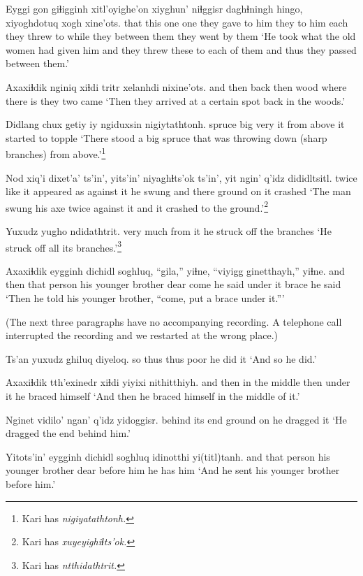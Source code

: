 \documentclass[12pt]{article}
\begin{document}
\gll Eyggi gon giɬigginh xitl'oyighe'on  xiyghun' niɬggisr daghɬningh hingo, xiyoghdotuq  {xogh xine'ots.}
that {this one} one {they gave to him} {they to him} each {they threw to} while {they between them} {they went by them}
\glt `He took what the old women had given him and they threw these to each of them and thus they passed between them.'	
\glend

\gll Axaxiɬdik nginiq xiɬdi tritr xelanhdi nixine'ots.
{and then} back then wood {where there is} {they two came}
\glt `Then they arrived at a certain spot back in the woods.'
\glend

\gll Didlang chux getiy iy ngiduxsin nigiytathtonh.
spruce  big very it {from above} {it started to topple}
\glt `There stood a big spruce that was throwing down (sharp branches) from above.'\footnote{Kari has \em nigiyatathtonh.}
\glend

\gll Nod xiq'i dixet'a' ts'in', yits'in'  niyaghɬts'ok ts'in', yit ngin'  q'idz dididltsitl.
twice like {it appeared} as {against it} {he swung} and there ground on {it crashed}
\glt `The man swung his axe twice against it and it crashed to the ground.'\footnote{Kari has \em xuyeyighiɬts'ok.}
\glend

\gll Yuxudz yugho ndidathtrit.
{very much} {from it} {he struck off the branches}
\glt `He struck off all its branches.'\footnote{Kari has \em ntthidathtrit.}
\glend

\gll Axaxiɬdik eygginh dichidl soghluq, ``gila,'' yiɬne, ``viyigg  ginetthayh,'' yiɬne. 
{and then} {that person} {his younger brother} dear come  {he said}  {under it} {brace} {he said}
\glt `Then he told his younger brother, ``come, put a brace under it.'''
\glend

(The next three paragraphs have no accompanying recording. A telephone call interrupted the recording and
we restarted at the wrong place.)

\gll Ts'an yuxudz ghiluq diyeloq.
so thus thus poor {he did it}
\glt `And so he did.'
\glend

\gll Axaxiɬdik tth'exinedr xiɬdi yiyixi nithitthiyh.
{and then} {in the middle} then  {under it} {he braced himself}
\glt `And then he braced himself in the middle of it.'
\glend

\gll Nginet vidilo' ngan'  q'idz yidoggisr.
behind  {its end}  ground  on {he dragged it}
\glt `He dragged the end behind him.'
\glend

\gll Yitots'in' eygginh dichidl  soghluq idinotthi yi(titl)tanh.
and  {that person} {his younger brother} dear  {before him} {he has him}
\glt `And he sent his younger brother before him.'
\glend
\end{document}
